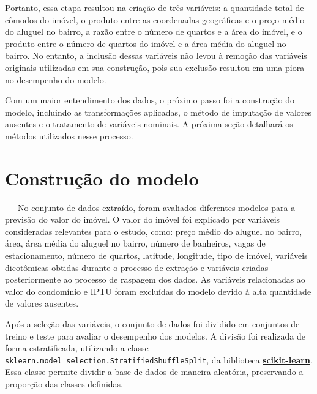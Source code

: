 \documentclass[
  12pt,
  a4paper,
]{scrreprt}
\begin{document}
\vspace{12pt}

Portanto, essa etapa resultou na criação de três variáveis: a quantidade
total de cômodos do imóvel, o produto entre as coordenadas geográficas e
o preço médio do aluguel no bairro, a razão entre o número de quartos e
a área do imóvel, e o produto entre o número de quartos do imóvel e a
área média do aluguel no bairro. No entanto, a inclusão dessas variáveis
não levou à remoção das variáveis originais utilizadas em sua
construção, pois sua exclusão resultou em uma piora no desempenho do
modelo.

\vspace{12pt}

Com um maior entendimento dos dados, o próximo passo foi a construção do
modelo, incluindo as transformações aplicadas, o método de imputação de
valores ausentes e o tratamento de variáveis nominais. A próxima seção
detalhará os métodos utilizados nesse processo.

\section{Construção do modelo}\label{construuxe7uxe3o-do-modelo}

~~~No conjunto de dados extraído, foram avaliados diferentes modelos
para a previsão do valor do imóvel. O valor do imóvel foi explicado por
variáveis consideradas relevantes para o estudo, como: preço médio do
aluguel no bairro, área, área média do aluguel no bairro, número de
banheiros, vagas de estacionamento, número de quartos, latitude,
longitude, tipo de imóvel, variáveis dicotômicas obtidas durante o
processo de extração e variáveis criadas posteriormente ao processo de
raspagem dos dados. As variáveis relacionadas ao valor do condomínio e
IPTU foram excluídas do modelo devido à alta quantidade de valores
ausentes.

\vspace{12pt}

Após a seleção das variáveis, o conjunto de dados foi dividido em
conjuntos de treino e teste para avaliar o desempenho dos modelos. A
divisão foi realizada de forma estratificada, utilizando a classe
\texttt{sklearn.model\_selection.StratifiedShuffleSplit}, da biblioteca
\href{https://scikit-learn.org/stable/}{\textbf{scikit-learn}}. Essa
classe permite dividir a base de dados de maneira aleatória, preservando
a proporção das classes definidas.

\vspace{12pt}
\end{document}
